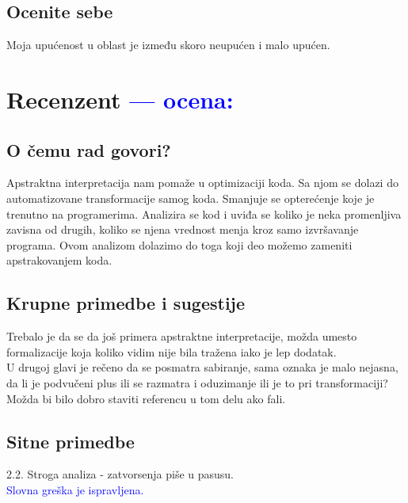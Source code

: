 \documentclass[a4paper]{report}
\newcommand{\odgovor}[1]{\textcolor{blue}{#1}}
\begin{document}
\section{Ocenite sebe}
Moja upućenost u oblast je između skoro neupućen i malo upućen.

\chapter{Recenzent \odgovor{--- ocena:} }


\section{O čemu rad govori?}
Apstraktna interpretacija nam pomaže u optimizaciji koda. Sa njom se dolazi do automatizovane transformacije samog koda. Smanjuje se opterećenje koje je trenutno na programerima. Analizira se kod i uviđa se koliko je neka promenljiva zavisna od drugih, koliko se njena vrednost menja kroz samo izvršavanje programa. Ovom analizom dolazimo do toga koji deo možemo zameniti apstrakovanjem koda. 

\section{Krupne primedbe i sugestije}
Trebalo je da se da još primera apstraktne interpretacije, možda umesto formalizacije koja koliko vidim nije bila tražena iako je lep dodatak.\\
U drugoj glavi je rečeno da se posmatra sabiranje, sama oznaka je malo nejasna, da li je podvučeni plus ili se razmatra i oduzimanje ili je to pri transformaciji? Možda bi bilo dobro staviti referencu u tom delu ako fali. 

\section{Sitne primedbe}
2.2. Stroga analiza - zatvorsenja piše u pasusu. \\
\odgovor{Slovna greška je ispravljena.}
\\
\end{document}
